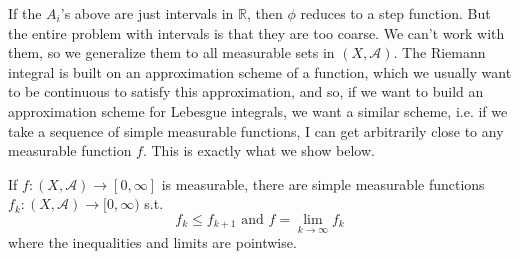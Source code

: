 \documentclass{article}
\begin{document}
      If the $A_i$'s above are just intervals in $\mathbb{R}$, then $\phi$ reduces to a step function. But the entire problem with intervals is that they are too coarse. We can't work with them, so we generalize them to all measurable sets in $(X, \mathcal{A})$. The Riemann integral is built on an approximation scheme of a function, which we usually want to be continuous to satisfy this approximation, and so, if we want to build an approximation scheme for Lebesgue integrals, we want a similar scheme, i.e. if we take a sequence of simple measurable functions, I can get arbitrarily close to any measurable function $f$. This is exactly what we show below. 

      \begin{theorem}
        If $f: (X, \mathcal{A}) \longrightarrow [0, \infty]$ is measurable, there are simple measurable functions $f_k : (X, \mathcal{A}) \longrightarrow [0, \infty)$ s.t. 
        \begin{equation}
          f_k \leq f_{k+1} \text{ and } f = \lim_{k \rightarrow \infty} f_k
        \end{equation}
        where the inequalities and limits are pointwise. 
      \end{theorem}
\end{document}
